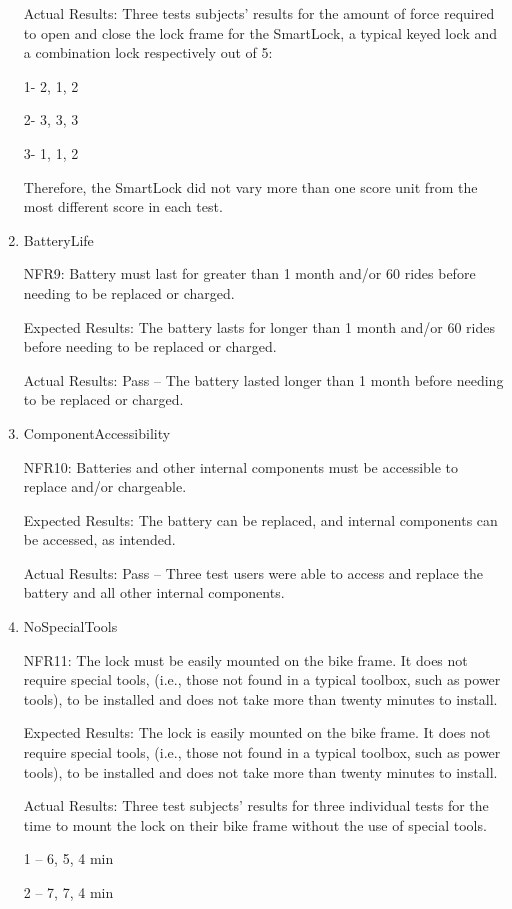 \documentclass[12pt, titlepage]{article}
\begin{document}
\begin{enumerate}
Actual Results: Three tests subjects’ results for the amount of force required to open and close the lock frame for the SmartLock, a typical keyed lock and a combination lock respectively out of 5: 

1- 2, 1, 2 

2- 3, 3, 3 

3- 1, 1, 2 

Therefore, the SmartLock did not vary more than one score unit from the most different score in each test. 

\item{BatteryLife

NFR9: Battery must last for greater than 1 month and/or 60 rides before needing to be replaced or charged.  }

Expected Results: The battery lasts for longer than 1 month and/or 60 rides before needing to be replaced or charged. 

Actual Results: Pass -- The battery lasted longer than 1 month before needing to be replaced or charged. 

\item{ComponentAccessibility

NFR10: Batteries and other internal components must be accessible to replace and/or chargeable. }

Expected Results: The battery can be replaced, and internal components can be accessed, as intended.

Actual Results: Pass -- Three test users were able to access and replace the battery and all other internal components.  

\item{NoSpecialTools

NFR11: The lock must be easily mounted on the bike frame. It does not require special tools, (i.e., those not found in a typical toolbox, such as power tools), to be installed and does not take more than twenty minutes to install. }

Expected Results: The lock is easily mounted on the bike frame. It does not require special tools, (i.e., those not found in a typical toolbox, such as power tools), to be installed and does not take more than twenty minutes to install.  

Actual Results: Three test subjects’ results for three individual tests for the time to mount the lock on their bike frame without the use of special tools.  

1 -- 6, 5, 4 min 

2 -- 7, 7, 4 min 


\end{enumerate}
\end{document}
